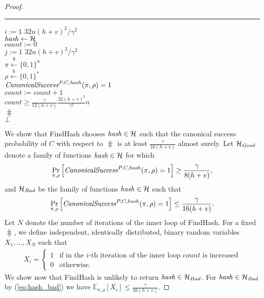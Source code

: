 \begin{proof}
\begin{codeblock}
  \medskip\hrule\medskip
  \For $i := 1$ \To $32n(h+v)^2/\gamma^2$ \Do \\
  \IndI $\operatorname{\mathit{hash}} \leftarrow{} \mathcal{H}$ \\
  \IndI $\mathit{count} := 0$ \\
  \IndI \For $j := 1$ \To $32n(h+v)^2/\gamma^2$ \Do \\
  \IndII $\pi \xleftarrow{\$} \{0,1\}^{n} $\\
  \IndII $\rho \xleftarrow{\$} \{0,1\}^*$ \\
  \IndII \If $\operatorname{\mathit{CanonicalSuccess}}^{P, C, \operatorname{\mathit{hash}}}(\pi, \rho) = 1$ \Then \\
  \IndIII $\mathit{count} := \mathit{count} + 1$\\
  \IndI \If $\mathit{count} \geq \frac{\gamma}{12(h+v)} \frac{32(h+v)^2}{\gamma^2}n$ \Then \\
  \IndII \Return $\hash$\\
  \Return $\bot$
\end{codeblock}
We show that FindHash chooses $\operatorname{\mathit{hash}} \in \mathcal{H}$ such that the canonical success probability of $C$
with respect to $\hash$ is at least $\frac{\gamma}{16(h+v)}$ almost surely.
Let $\mathcal{H}_{\mathit{Good}}$ denote a family of functions $\operatorname{\mathit{hash}} \in \mathcal{H}$ for which
\begin{align}
  \label{eq:hash_good}
\underset{\pi, \rho}{\Pr}\left[\operatorname{\mathit{CanonicalSuccess}}^{P, C, \operatorname{\mathit{hash}}}(\pi, \rho) = 1\right] \geq \frac{\gamma}{8(h+v)},
\end{align}
and $\mathcal{H}_{\mathit{Bad}}$ be the family of functions $\operatorname{\mathit{hash}} \in \mathcal{H}$ such that
\begin{align}
  \label{eq:hash_bad}
    \underset{\pi, \rho}{\Pr}\left[\operatorname{\mathit{CanonicalSuccess}}^{P, C, \operatorname{\mathit{hash}}}(\pi, \rho) = 1\right] \leq \frac{\gamma}{16(h+v)}.
    \end{align}
%
Let $N$ denote the number of iterations of the inner loop of FindHash.
For a fixed $\hash$, we define independent, identically distributed, binary random variables $X_1, \dots, X_{N}$ such that
\begin{align*}
  X_i =
  \begin{cases}
    1 & \text{if in the $i$-th iteration of the inner loop $\mathit{count}$ is increased}\\
    0 & \text{otherwise.}
  \end{cases}
\end{align*}
We show now that FindHash is unlikely to return $\operatorname{\mathit{hash}} \in \mathcal{H}_{Bad}$.
For $\operatorname{\mathit{hash}} \in \mathcal{H}_{\mathit{Bad}}$ by (\ref{eq:hash_bad}) we have $\mathbb{E}_{{\pi}, \rho}[X_i] \leq \frac{\gamma}{16(h+v)}$.

\end{proof}
